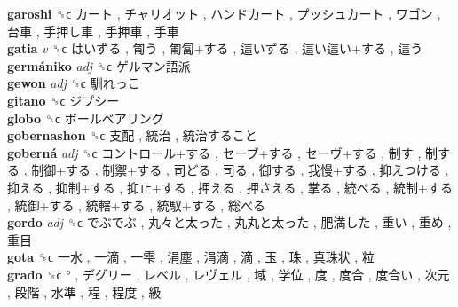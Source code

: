 \textbf{garoshi} ␝ϲ   カート ,  チャリオット ,  ハンドカート ,  プッシュカート ,  ワゴン ,  台車 ,  手押し車 ,  手押車 ,  手車   \\
\textbf{gatia} \emph{v}  ␝ϲ   はいずる ,  匍う ,  匍匐+する ,  這いずる ,  這い這い+する ,  這う   \\
\textbf{germániko} \emph{adj}  ␝ϲ   ゲルマン語派   \\
\textbf{gewon} \emph{adj}  ␝ϲ   馴れっこ   \\
\textbf{gitano} ␝ϲ   ジプシー   \\
\textbf{globo} ␝ϲ   ボールベアリング   \\
\textbf{gobernashon} ␝ϲ   支配 ,  統治 ,  統治すること   \\
\textbf{goberná} \emph{adj}  ␝ϲ   コントロール+する ,  セーブ+する ,  セーヴ+する ,  制す ,  制する ,  制御+する ,  制禦+する ,  司どる ,  司る ,  御する ,  我慢+する ,  抑えつける ,  抑える ,  抑制+する ,  抑止+する ,  押える ,  押さえる ,  掌る ,  統べる ,  統制+する ,  統御+する ,  統轄+する ,  統馭+する ,  総べる   \\
\textbf{gordo} \emph{adj}  ␝ϲ   でぶでぶ ,  丸々と太った ,  丸丸と太った ,  肥満した ,  重い ,  重め ,  重目   \\
\textbf{gota} ␝ϲ   一水 ,  一滴 ,  一雫 ,  涓塵 ,  涓滴 ,  滴 ,  玉 ,  珠 ,  真珠状 ,  粒   \\
\textbf{grado} ␝ϲ   ° ,  デグリー ,  レベル ,  レヴェル ,  域 ,  学位 ,  度 ,  度合 ,  度合い ,  次元 ,  段階 ,  水準 ,  程 ,  程度 ,  級   \\
